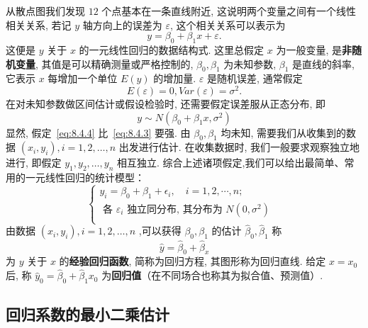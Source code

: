 \begin{example}
    从散点图我们发现 $12$ 个点基本在一条直线附近, 这说明两个变量之间有一个线性相关关系, 若记 $y$ 轴方向上的误差为 $\varepsilon$, 这个相关关系可以表示为
    \begin{equation}
      y = \beta_0 + \beta_1 x + \varepsilon .
    \end{equation}
    这便是 $y$ 关于 $x$ 的一元线性回归的数据结构式. 这里总假定 $x$ 为一般变量, 是\textbf{非随机变量}, 其值是可以精确测量或严格控制的, $\beta_0, \beta_1$ 为未知参数, $\beta_1$ 是直线的斜率, 它表示 $x$ 每增加一个单位 $E(y)$ 的增加量. $\varepsilon$ 是随机误差, 通常假定
    \begin{equation}\label{eq:8.4.3}
      E(\varepsilon) = 0, Var(\varepsilon) = \sigma^{2}. 
    \end{equation}
    在对未知参数做区间估计或假设检验时, 还需要假定误差服从正态分布, 即
    \begin{equation}\label{eq:8.4.4}
      y \sim N(\beta_0 + \beta_1 x, \sigma^2)
    \end{equation}
    显然, 假定~\ref{eq:8.4.4} 比~\ref{eq:8.4.3} 要强.
    由 $\beta_0, \beta_1$ 均未知, 需要我们从收集到的数据 $(x_i, y_i), i=1,2, \ldots, n$ 出发进行估计. 在收集数据时, 我们一般要求观察独立地进行, 即假定 $y_{1}, y_{2},\ldots, y_{n}$ 相互独立. 综合上述诸项假定,我们可以给出最简单、常用的一元线性回归的统计模型：
    \begin{equation}\label{eq:8.4.5}
    \begin{cases}
      y_i = \beta _0 + \beta _1 + \epsilon_{i} , \quad i =1, 2, \cdots, n; & \\
      \text{ 各 }\varepsilon_{i} \text{ 独立同分布, 其分布为 } N(0, \sigma^{2}) & \\
    \end{cases}
    \end{equation}
    由数据 $(x_{i}, y_{i}), i=1,2, \ldots, n$ ,可以获得 $\beta_0, \beta_1$ 的估计 $\hat{\beta}_0, \hat{\beta}_1$ 称
    \begin{equation}\label{eq:8.4.6}
    \hat{y} = \hat{\beta}_0 + \hat{\beta} _x
    \end{equation}
    为 $y$ 关于 $x$ 的\textbf{经验回归函数}, 简称为回归方程, 其图形称为回归直线. 给定 $x=x_0$ 后, 称 $ \hat{y}_{0} = \hat{\beta}_0 + \hat{\beta}_1 x_{0}$ 为\textbf{回归值}（在不同场合也称其为拟合值、预测值）.
\end{example}

\subsection{回归系数的最小二乘估计}\label{ssec:8.4.3}

